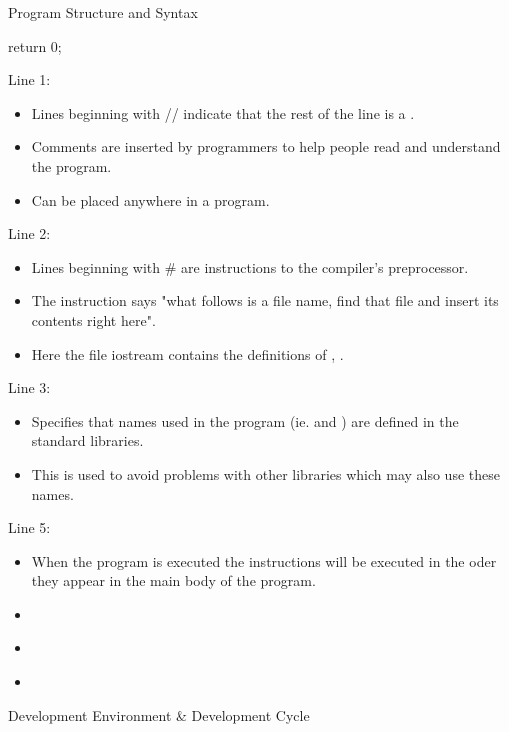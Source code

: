\documentclass[../lecture1-introduction.tex]{subfiles}
\begin{document}
\begin{frame}[fragile]{Program Structure and Syntax}
\begin{cppcode}
{            return 0;
        }
    \end{cppcode}
    {
        Line 1:
        \begin{itemize}
            \item Lines beginning with // indicate that the rest of the line
            is a .
            \item Comments are inserted by programmers to help people read
            and understand the program.
            \item Can be placed anywhere in a program.
        \end{itemize}
    }
    {
        Line 2:
        \begin{itemize}
            \item Lines beginning with \# are instructions to the compiler's
            preprocessor.
            \item The  instruction says "what follows is a file name,
            find that file and insert its contents right here".
            \item Here the file iostream contains the definitions of
            , .
        \end{itemize}
    }
    {
        Line 3:
        \begin{itemize}
            \item Specifies that names used in the program (ie.  and
            ) are defined in the standard libraries.
            \item This is used to avoid problems with other libraries which may
            also use these names.
        \end{itemize}
    }
    {
        Line 5:
        \begin{itemize}
            \item When the program is executed the instructions will be executed
            in the oder they appear in the main body of the program.
            \item 
        \end{itemize}
    }
    {
        \begin{itemize}
            \item
        \end{itemize}
    }
    {
        \begin{itemize}
            \item
        \end{itemize}
    }
\end{frame}


\begin{frame}[fragile]{Development Environment \& Development Cycle}



\end{frame}

\end{document}
